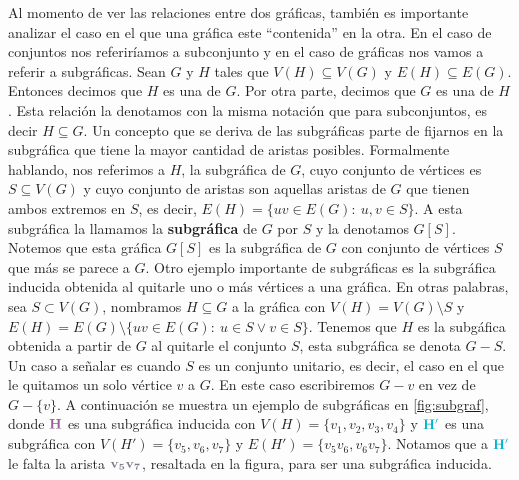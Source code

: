 Al momento de ver las relaciones entre dos gr\'aficas, tambi\'en es importante
analizar el caso en el que una gr\'afica este ``contenida'' en la otra. En el
caso de conjuntos nos referir\'iamos a subconjunto y en el caso de gr\'aficas
nos vamos a referir a subgr\'aficas. Sean $G$ y $H$ tales que $V(H) \subseteq
V(G)$ y $E(H) \subseteq E(G)$. Entonces decimos que $H$ es una
 de $G$. Por otra parte, decimos que $G$ es una
 de $H$. Esta relaci\'on la denotamos con la misma
notaci\'on que para subconjuntos, es decir $H \subseteq G$. Un concepto que se
deriva de las subgr\'aficas parte de fijarnos en la subgr\'afica que tiene la
mayor cantidad de aristas posibles. Formalmente hablando, nos referimos a $H$,
la subgr\'afica de $G$, cuyo conjunto de v\'ertices es $S \subseteq V(G)$ y cuyo
conjunto de aristas son aquellas aristas de $G$ que tienen ambos extremos en
$S$, es decir, $E(H) = \{uv \in E(G) \colon\ u,v \in S\}$. A esta subgr\'afica
la llamamos la \textbf{subgr\'afica}  de $G$
por $S$ y la denotamos $G[S]$. Notemos que esta gr\'afica $G[S]$ es la
subgr\'afica de $G$ con conjunto de v\'ertices $S$ que m\'as se parece a $G$.
Otro ejemplo importante de subgr\'aficas es la subgr\'afica inducida obtenida al
quitarle uno o m\'as v\'ertices a una gr\'afica. En otras palabras, sea $S
\subset V(G)$, nombramos $H \subseteq G$ a la gr\'afica con $V(H)=V(G) \setminus
S$ y $E(H) = E(G)\setminus\{uv \in E(G) \colon\ u \in S \lor v \in S\}$. Tenemos
que $H$ es la subg\'afica obtenida a partir de $G$ al quitarle el conjunto $S$,
esta subgr\'afica se denota $G-S$. Un caso a se\~{n}alar es cuando $S$ es un
conjunto unitario, es decir, el caso en el que le quitamos un solo v\'ertice $v$
a $G$. En este caso escribiremos $G-v$ en vez de $G-\{v\}$. A continuaci\'on se
muestra un ejemplo de subgr\'aficas en \cref{fig:subgraf}, donde
${\color{morado}\bf H}$ es una subgr\'afica inducida con $V(H) =
\{v_1,v_2,v_3,v_4\}$ y ${\color{azulCielo}\bf H'}$ es una subgr\'afica con
$V(H')=\{v_5,v_6,v_7\}$ y $E(H')=\{v_5v_6,  v_6v_7\}$. Notamos que a
${\color{azulCielo}\bf H'}$ le falta la arista ${\color{grisOscuro!80}\bf
v_5v_7}$, resaltada en la figura, para ser una subgr\'afica inducida. 


